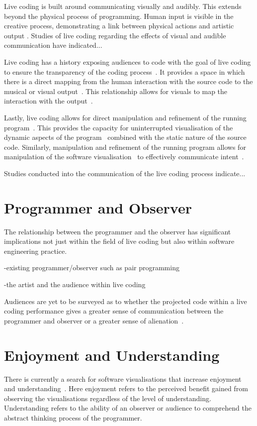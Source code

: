 Live coding is built around communicating visually and audibly. This extends beyond the physical process of programming. Human input is visible in the creative process, demonstrating a link between physical actions and artistic output \cite{Mclean}. Studies of live coding regarding the effects of visual and audible communication have indicated...

Live coding has a history exposing audiences to code with the goal of live coding to ensure the transparency of the coding process~\cite{Collins2011,McLean2010a}. It provides a space in which there is a direct mapping from the human interaction with the source code to the musical or visual output~\cite{Mclean}. This relationship allows for visuals to map the interaction with the output~.

Lastly, live coding allows for direct manipulation and refinement of the running program~\cite{Swift2013}. This provides the capacity for uninterrupted visualisation of the dynamic aspects of the program~ combined with the static nature of the source code. Similarly, manipulation and refinement of the running program allows for manipulation of the software visualisation~\cite{McLean2010a} to effectively communicate intent~.

Studies conducted into the communication of the live coding process indicate...

\section{Programmer and Observer}

The relationship between the programmer and the observer has significant implications not just within the field of live coding but also within software engineering practice.

-existing programmer/observer such as pair programming

-the artist and the audience within live coding

Audiences are yet to be surveyed as to whether the projected code within a live coding performance gives a greater sense of communication between the programmer and observer or a greater sense of alienation~\cite{Mclean2011}.

\section{Enjoyment and Understanding}

There is currently a search for software visualisations that increase enjoyment and understanding~\cite{McLean2010a}. Here enjoyment refers to the perceived benefit gained from observing the visualisations regardless of the level of understanding. Understanding refers to the ability of an observer or audience to comprehend the abstract thinking process of the programmer.

